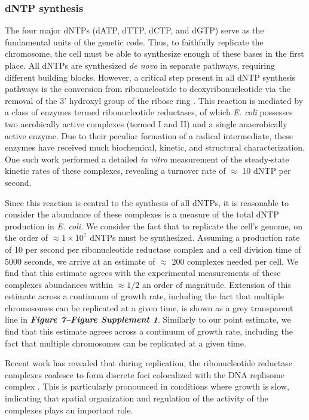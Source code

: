 \subsubsection{dNTP synthesis}
The four major dNTPs (dATP, dTTP, dCTP, and dGTP) serve as the fundamental
units of the genetic code. Thus, to faithfully replicate the chromosome, the
cell must be able to synthesize enough of these bases in the first place. All
dNTPs are synthesized \textit{de novo} in separate pathways, requiring
different building blocks. However, a critical step present in all dNTP
synthesis pathways is the conversion from ribonucleotide to
deoxyribonucleotide via the removal of the 3' hydroxyl group of the ribose
ring \citep{rudd2016}. This reaction is mediated by a class of enzymes termed
ribonucleotide reductases, of which \textit{E. coli} possesses two
aerobically active complexes (termed I and II) and a single anaerobically
active enzyme. Due to their peculiar formation of a radical intermediate,
these enzymes have received much biochemical, kinetic, and structural
characterization. One such work \citep{ge2003} performed a detailed
\textit{in vitro} measurement of the steady-state kinetic rates of these
complexes, revealing a turnover rate of $\approx$ 10 dNTP per second.

Since this reaction is central to the synthesis of all dNTPs, it is reasonable
to consider the abundance of these complexes is a measure of the total dNTP
production in \textit{E. coli}. We consider the fact that to replicate the
cell's genome, on the order of $\approx 1\times 10^{7}$ dNTPs must be
synthesized. Assuming a production rate of 10 per second per ribonucleotide
reductase complex and a cell division time of 5000 seconds, we arrive at an
estimate of $\approx$ 200 complexes needed per cell. We find that this estimate
agrees with the experimental measurements of these complexes abundances within
$\approx 1/2$ an order of magnitude. Extension of this estimate across a
continuum of growth rate, including the fact that multiple chromosomes can be
replicated at a given time, is shown as a grey transparent line in
\textbf{\textit{Figure 7–Figure Supplement 1}}.  Similarly to our point
estimate, we find that this estimate agrees  across a continuum of growth rate,
including the fact that multiple chromosomes can be replicated at a given time.

Recent work has revealed that during replication, the ribonucleotide
reductase complexes coalesce to form discrete foci colocalized with the DNA
replisome complex \citep{sanchez-romero2011}. This is particularly pronounced
in conditions where growth is slow, indicating that spatial organization and
regulation of the activity of the complexes plays an important role.

